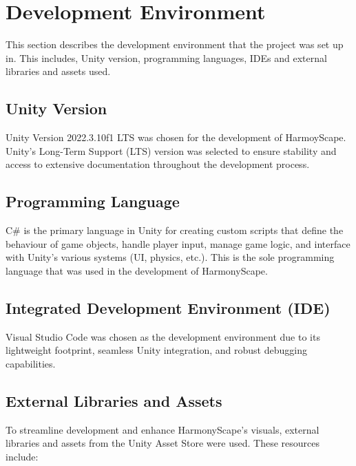 \documentclass{l4proj}
\begin{document}
\section{Development Environment}
This section describes the development environment that the project was set up in. This includes, Unity version, programming languages, IDEs and external libraries and assets used.

\subsection{Unity Version}
Unity Version 2022.3.10f1 LTS was chosen for the development of HarmoyScape. Unity's Long-Term Support (LTS) version was selected to ensure stability and access to extensive documentation throughout the development process.

\subsection{Programming Language}
C\# is the primary language in Unity for creating custom scripts that define the behaviour of game objects, handle player input, manage game logic, and interface with Unity's various systems (UI, physics, etc.). This is the sole programming language that was used in the development of HarmonyScape.

\subsection{Integrated Development Environment (IDE)}
Visual Studio Code was chosen as the development environment due to its lightweight footprint, seamless Unity integration, and robust debugging capabilities.

\subsection{External Libraries and Assets}
To streamline development and enhance HarmonyScape's visuals, external libraries and assets from the Unity Asset Store were used. These resources include:
\end{document}

